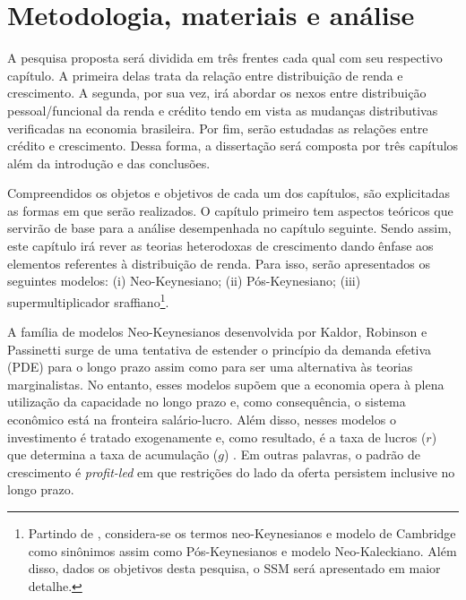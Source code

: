 \section{Metodologia, materiais e análise}\label{Metodo}

A pesquisa proposta será dividida em três frentes cada qual com seu respectivo capítulo.
A primeira delas trata da relação entre distribuição de renda e crescimento. A segunda, por sua vez, irá abordar os nexos entre distribuição pessoal/funcional da renda e crédito tendo em vista as mudanças distributivas verificadas na economia brasileira. Por fim, serão estudadas as relações entre crédito e crescimento. 
Dessa forma, a dissertação será composta por três capítulos além da introdução e das conclusões.  


Compreendidos os objetos e objetivos de cada um dos capítulos, são explicitadas as formas em que serão realizados. O capítulo primeiro tem aspectos teóricos que servirão de base para a análise desempenhada no capítulo seguinte.
Sendo assim, este capítulo irá rever as teorias heterodoxas de crescimento dando ênfase aos elementos referentes à distribuição de renda. Para isso, serão apresentados os seguintes modelos: (i) Neo-Keynesiano; (ii) Pós-Keynesiano; (iii) supermultiplicador sraffiano\footnote{Partindo de \textcite[Capítulo 6]{lavoie_post-keynesian_2014}, considera-se os termos neo-Keynesianos e modelo de Cambridge como sinônimos assim como Pós-Keynesianos e modelo Neo-Kaleckiano. Além disso, dados os objetivos desta pesquisa, o SSM será apresentado em maior detalhe.}. 

A família de modelos Neo-Keynesianos desenvolvida por Kaldor, Robinson e Passinetti surge de uma tentativa de estender o princípio da demanda efetiva (PDE) para o longo prazo assim como para ser uma alternativa às teorias marginalistas. No entanto, esses modelos supõem que a economia opera à plena utilização da capacidade no longo prazo e, como consequência, o sistema econômico está na fronteira salário-lucro. Além disso, nesses modelos o investimento é tratado exogenamente e, como resultado, é a taxa de lucros ($r$) que determina a taxa de acumulação ($g$) \cite[Capítulo 6]{lavoie_post-keynesian_2014}. Em outras palavras, o padrão de crescimento é \textit{profit-led} em que restrições do lado da oferta persistem inclusive no longo prazo.

